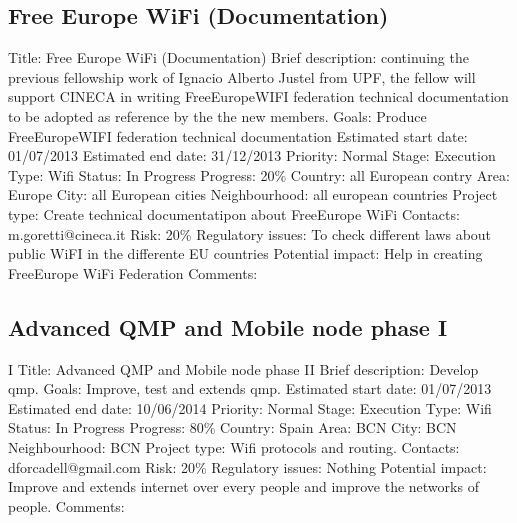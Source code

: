 \documentclass[draftclsnofoot,12pt,journal,onecolumn]{IEEEtran}
\begin{document}
\subsection{Free Europe WiFi (Documentation)} 
Title: Free Europe WiFi (Documentation) 
Brief description: continuing the previous fellowship work of Ignacio Alberto 
Justel from UPF, the fellow will support CINECA in writing FreeEuropeWIFI 
federation technical documentation to be adopted as reference by the the new 
members. 
Goals: Produce  FreeEuropeWIFI federation technical documentation 
Estimated start date: 01/07/2013 
Estimated end date: 31/12/2013 
Priority: Normal 
Stage: Execution 
Type: Wifi 
Status: In Progress 
Progress: 20\% 
Country: all European contry 
Area: Europe 
City: all European cities 
Neighbourhood: all european countries 
Project type: Create technical documentatipon about FreeEurope WiFi 
Contacts: m.goretti@cineca.it
Risk: 20\% 
Regulatory issues: To check different laws about public WiFI in the 
differente EU countries 
Potential impact: Help in creating FreeEurope WiFi Federation 
Comments: 
\subsection{Advanced QMP and Mobile node phase I}I
Title: Advanced QMP and Mobile node phase II
Brief description: Develop qmp.
Goals: Improve, test and extends qmp.
Estimated start date: 01/07/2013
Estimated end date: 10/06/2014
Priority: Normal
Stage: Execution
Type: Wifi
Status: In Progress
Progress: 80\%
Country: Spain
Area: BCN
City: BCN
Neighbourhood: BCN
Project type: Wifi protocols and routing.
Contacts: dforcadell@gmail.com
Risk: 20\%
Regulatory issues: Nothing
Potential impact: Improve and extends internet over every people and improve
the networks of people.
Comments:
\end{document}
